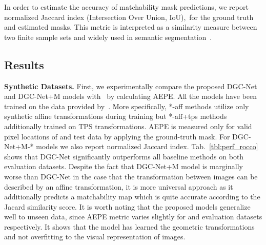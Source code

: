 \documentclass[10pt,twocolumn,letterpaper]{article}
\begin{document}
In order to estimate the accuracy of matchability mask predictions, we report normalized Jaccard index (Intersection Over Union, IoU),~\ie  for the ground truth and estimated masks. This metric is interpreted as a similarity measure between two finite sample sets and widely used in semantic segmentation~\cite{ods_segm}.

\vspace{-1mm}
\subsection{Results}\label{ssec:results}
\noindent\textbf{Synthetic Datasets.} First, we experimentally compare the proposed DGC-Net and DGC-Net+M models with~\cite{Rocco17} by calculating AEPE. All the models have been trained on the data provided by~\cite{Rocco17}. More specifically, *-aff methods utilize only synthetic affine transformations during training but *-aff+tps methods additionally trained on TPS transformations. AEPE is measured only for valid pixel locations of  and  test data by applying the ground-truth mask. For DGC-Net+M-* models we also report normalized Jaccard index. Tab.~\ref{tbl:perf_rocco} shows that DGC-Net significantly outperforms all baseline methods on both evaluation datasets. Despite the fact that DGC-Net+M model is marginally worse than DGC-Net in the case that the transformation between images can be described by an affine transformation, it is more universal approach as it additionally predicts a matchability map which is quite accurate according to the Jacard similarity score. It is worth noting that the proposed models generalize well to unseen data, since AEPE metric varies slightly for  and  evaluation datasets respectively. It shows that the model has learned the geometric transformations and not overfitting to the visual representation of images.
\end{document}
